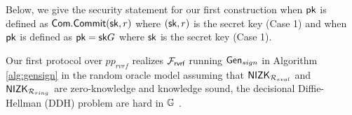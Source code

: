 Below, we give the security statement for our first construction when $ \mathsf{pk} $ is defined as $ \mathsf{Com}.\mathsf{Commit}(\mathsf{sk},r) $ where $ (\mathsf{sk}, r) $ is the secret key (Case 1) and  when $ \mathsf{pk} $ is defined as $ \mathsf{pk} = \mathsf{sk}G $ where $ \mathsf{sk} $ is the secret key (Case 1).
\begin{theorem}\label{thm:firstprotocol}
	Our first protocol over  $ pp_{rvrf} $ realizes \cite{canetti1,canetti2}  $ \mathcal{F}_{\textsf{rvrf}} $ running $ \mathsf{Gen}_{sign} $ in Algorithm \ref{alg:gensign} in the random oracle model assuming that $ {\mathsf{NIZK}}_{\mathcal{R}_{eval}} $ and $ {\mathsf{NIZK}}_{\mathcal{R}_{ring}}$ are zero-knowledge and knowledge sound, the decisional Diffie-Hellman (DDH) problem are hard in $ {\mathbb{G}}  $ . 
\end{theorem}

